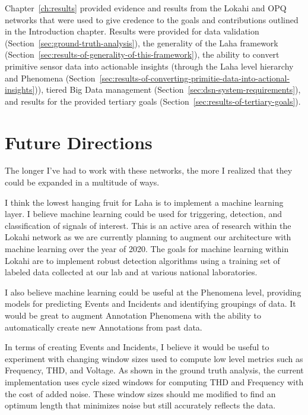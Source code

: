 Chapter~\ref{ch:results} provided evidence and results from the Lokahi and OPQ networks that were used to give credence to the goals and contributions outlined in the Introduction chapter. Results were provided for data validation (Section~\ref{sec:ground-truth-analysis}), the generality of the Laha framework (Section~\ref{sec:results-of-generality-of-this-framework}), the ability to convert primitive sensor data into actionable insights (through the Laha level hierarchy and Phenomena (Section~\ref{sec:results-of-converting-primitie-data-into-actional-insights})), tiered Big Data management (Section~\ref{sec:dsn-system-requirements}), and results for the provided tertiary goals (Section~\ref{sec:results-of-tertiary-goals}).

\section{Future Directions}\label{sec:future-directions}

The longer I've had to work with these networks, the more I realized that they could be expanded in a multitude of ways.

I think the lowest hanging fruit for Laha is to implement a machine learning layer. I believe machine learning could be used for triggering, detection, and classification of signals of interest. This is an active area of research within the Lokahi network as we are currently planning to augment our architecture with machine learning over the year of 2020. The goals for machine learning within Lokahi are to implement robust detection algorithms using a training set of labeled data collected at our lab and at various national laboratories.

I also believe machine learning could be useful at the Phenomena level, providing models for predicting Events and Incidents and identifying groupings of data. It would be great to augment Annotation Phenomena with the ability to automatically create new Annotations from past data.

In terms of creating Events and Incidents, I believe it would be useful to experiment with changing window sizes used to compute low level metrics such as Frequency, THD, and Voltage. As shown in the ground truth analysis, the current implementation uses cycle sized windows for computing THD and Frequency with the cost of added noise. These window sizes should me modified to find an optimum length that minimizes noise but still accurately reflects the data.

